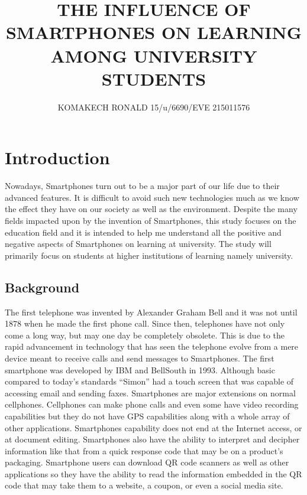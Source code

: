 \documentclass {article}
\begin{document}
\title{THE INFLUENCE OF SMARTPHONES ON LEARNING AMONG UNIVERSITY STUDENTS}
\author{KOMAKECH RONALD 15/u/6690/EVE 215011576}

\maketitle

\section{Introduction}
Nowadays, Smartphones turn out to be a major part of our life due to their advanced features. It is difficult to avoid such new technologies much as we know the effect they have on our society as well as the environment. Despite the many fields impacted upon by the invention of Smartphones, this study focuses on the education field and it is intended to help me understand all the positive and negative aspects of Smartphones on learning at university. The study will primarily focus on students at higher institutions of learning namely university.




\subsection{Background}

The first telephone was invented by Alexander Graham Bell and it was not until 1878 when he made the first phone call.  Since then, telephones have not only come a long way, but may one day be completely obsolete. 
This is due to the rapid advancement in technology that has seen the telephone evolve from a mere device meant to receive calls and send messages to Smartphones.
The first smartphone was developed by IBM and BellSouth in 1993. Although basic compared to today’s standards “Simon” had a touch screen that was capable of accessing email and sending faxes. 
Smartphones are major extensions on normal cellphones. Cellphones can make phone calls and even some have video recording capabilities but they do not have GPS capabilities along with a whole array of other applications. 
Smartphones capability does not end at the Internet access, or at document editing. Smartphones also have the ability to interpret and decipher information like that from a quick response code that may be on a product’s packaging. Smartphone users can download QR code scanners as well as other applications so they have the ability to read the information embedded in the QR code that may take them to a website, a coupon, or even a social media site.
\end{document}
